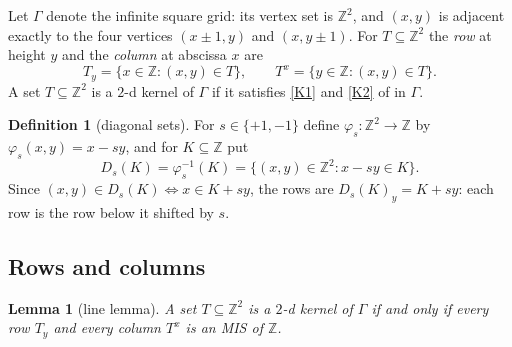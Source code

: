 \documentclass[11pt]{article}
\theoremstyle{plain}
\newtheorem{lemma}[lemma]{Lemma}
\theoremstyle{definition}
\newtheorem{definition}[definition]{Definition}
\theoremstyle{remark}
\newcommand{\Z}{\mathbb{Z}}
\newcommand{\Dg}[2]{D_{#1}(#2)}
\begin{document}
Let $\Gamma$ denote the infinite square grid: its vertex set is $\Z^2$, and $(x,y)$ is
adjacent exactly to the four vertices $(x \pm 1, y)$ and $(x, y \pm 1)$. For $T \subseteq \Z^2$
the \emph{row} at height $y$ and the \emph{column} at abscissa $x$ are
\[
T_y = \{x \in \Z : (x,y) \in T\}, \qquad T^x = \{y \in \Z : (x,y) \in T\}.
\]
A set $T \subseteq \Z^2$ is a $2$-d kernel of $\Gamma$ if it satisfies \ref{K1} and \ref{K2}
of  in $\Gamma$.

\begin{definition}[diagonal sets]\label{def:diagonal}
For $s \in \{+1, -1\}$ define $\varphi_s : \Z^2 \to \Z$ by $\varphi_s(x,y) = x - sy$, and for
$K \subseteq \Z$ put
\[
\Dg{s}{K} = \varphi_s^{-1}(K) = \{(x,y) \in \Z^2 : x - sy \in K\}.
\]
Since $(x,y) \in \Dg{s}{K} \iff x \in K + sy$, the rows are $\Dg{s}{K}_y = K + sy$: each row is
the row below it shifted by $s$.
\end{definition}

\subsection{Rows and columns}

\begin{lemma}[line lemma]\label{lem:line}
A set $T \subseteq \Z^2$ is a $2$-d kernel of $\Gamma$ if and only if every row $T_y$ and
every column $T^x$ is an MIS of $\Z$.
\end{lemma}
\end{document}
